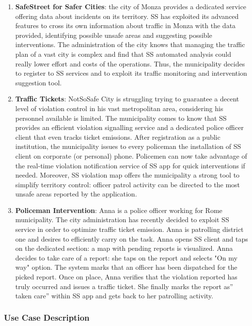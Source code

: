 \begin{enumerate}
	\item \textbf{SafeStreet for Safer Cities}: the city of Monza provides a dedicated service offering data about incidents on its territory. SS has exploited its advanced features to cross its own information about traffic in Monza with the data provided, identifying possible unsafe areas and suggesting possible interventions. The administration of the city knows that managing the traffic plan of a vast city is complex and find that SS automated analysis could really lower effort and costs of the operations. Thus, the municipality decides to register to SS services and to exploit its traffic monitoring and intervention suggestion tool. 
	\item \textbf{Traffic Tickets}: NotSoSafe City is struggling trying to guarantee a decent level of violation control in his vast metropolitan area, considering his personnel available is limited. The municipality comes to know that SS provides an efficient violation signalling service and a dedicated police officer client that even tracks ticket emissions. After registration as a public institution, the municipality issues to every policeman the installation of SS client on corporate (or personal) phone. Policemen can now take advantage of the real-time violation notification service of SS app for quick interventions if needed. Moreover, SS violation map offers the municipality a strong tool to simplify territory control: officer patrol activity can be directed to the most unsafe areas reported by the application.
	\newpage
	\item  \textbf{Policeman Intervention}: Anna is a police officer working for Rome municipality. The city administration has recently decided to exploit SS service in order to optimize traffic ticket emission. Anna is patrolling district one and desires to efficiently carry on the task. Anna opens SS client and taps on the dedicated section: a map with pending reports is visualized. Anna decides to take care of a report: she taps on the report and selects "On my way" option. The system marks that an officer has been dispatched for the picked report. Once on place, Anna verifies that the violation reported has truly occurred and issues a traffic ticket. She finally marks the report as” taken care” within SS app and gets back to her patrolling activity.
	\end{enumerate}
	
	\medskip
	
	\subsubsection{Use Case Description}
	\medskip
	
